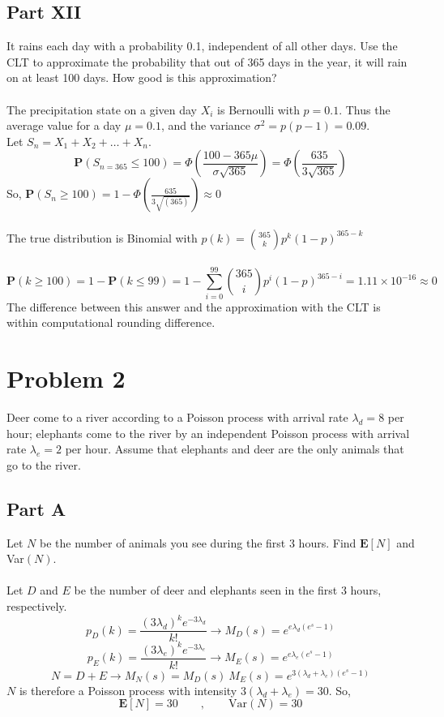 \documentclass{amsart}
\begin{document}
	\subsection{Part XII}
	It rains each day with a probability 0.1, independent of all other days. Use the CLT to approximate the probability that out of 365 days in the year, it will rain on at least 100 days. How good is this approximation?\\
	\\
	The precipitation state on a given day $X_i$ is Bernoulli with $p=0.1$. Thus the average value for a day $\mu=0.1$, and the variance $\sigma^2=p(p-1)=0.09$.
	\\
	Let $S_n = X_1 + X_2 + \dots +X_n$.
	\[
	\mathbf{P}(S_{n=365}\leq 100) = \Phi\left(
	\frac{100 - 365\mu}{\sigma\sqrt{365}}
	\right)=\Phi\left(\frac{635}{3\sqrt{365}}
	\right)
	\]
	So, $\mathbf{P}(S_n\geq 100) = 1 - \Phi\left(\frac{635}{3\sqrt{(365)}}\right) \approx 0$\\
	\\
	The true distribution is Binomial with $p(k) = \binom{365}{k}p^k(1-p)^{365-k}$\\\\
	\[
	\mathbf{P}(k\geq 100) = 1 -\mathbf{P}(k \leq 99) = 1-\sum_{i=0}^{99}\binom{365}{i}p^i(1-p)^{365-i} = 1.11\times 10^{-16} \approx 0
	\]
	The difference between this answer and the approximation with the CLT is within computational rounding difference.
	\pagebreak
	\section{Problem 2}
	Deer come to a river according to a Poisson process with arrival rate $\lambda_d=8$ per hour; elephants come to the river by an independent Poisson process with arrival rate $\lambda_e=2$ per hour. Assume that elephants and deer are the only animals that go to the river.
	\\
	\subsection{Part A}
	Let $N$ be the number of animals you see during the first 3 hours. Find $\mathbf{E}[N]$ and Var$(N)$.\\
	\\
	Let $D$ and $E$ be the number of deer and elephants seen in the first 3 hours, respectively.
	\[
	p_D(k) = \frac{(3\lambda_d)^k e^{-3\lambda_d}}{k!}
	\rightarrow M_D(s) = e^{e\lambda_d(e^s-1)}
	\]
	\[
	p_E(k) = \frac{(3\lambda_e)^k e^{-3\lambda_e}}{k!}
	\rightarrow M_E(s) = e^{e\lambda_e(e^s-1)}
	\]
	\[
	N = D + E \rightarrow M_N(s) = M_D(s)~M_E(s) = 
	e^{3(\lambda_d+\lambda_e)(e^s-1)}
	\]
	$N$ is therefore a Poisson process with intensity $3(\lambda_d+\lambda_e) = 30$. So, 
	\[
	\mathbf{E}[N] = 30 \qquad , \qquad \text{Var}(N)=30
	\]
\end{document}
